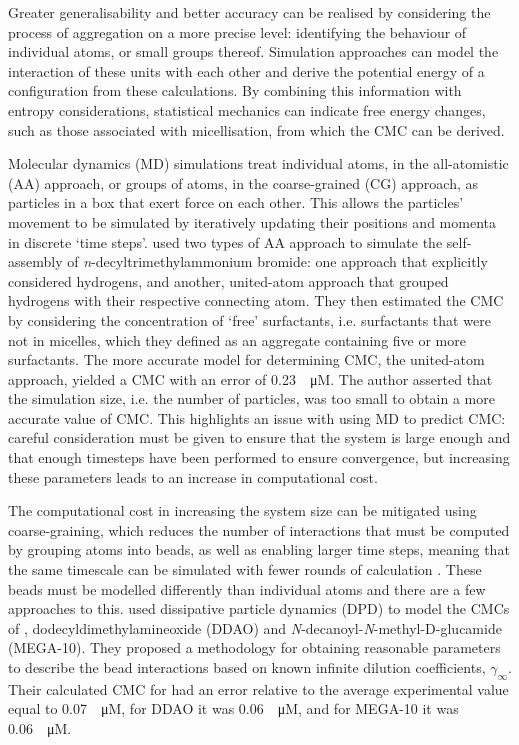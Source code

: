 Greater generalisability and better accuracy can be realised by considering the
process of aggregation on a more precise level: identifying the behaviour of
individual atoms, or small groups thereof. Simulation approaches can model the
interaction of these units with each other and derive the potential energy of a
configuration from these calculations. By combining this information with
entropy considerations, statistical mechanics can indicate free energy changes,
such as those associated with micellisation, from which the CMC can be derived.

Molecular dynamics (MD) simulations treat individual atoms, in the all-atomistic
(AA) approach, or groups of atoms, in the coarse-grained (CG) approach, as
particles in a box that exert force on each other. This allows the particles'
movement to be simulated by iteratively updating their positions and momenta in
discrete `time steps'. \citet{jorgeMolecularDynamicsSimulation2008} used two
types of AA approach to simulate the self-assembly of
\textit{n}-decyltrimethylammonium bromide: one approach that explicitly
considered hydrogens, and another, united-atom approach that grouped hydrogens
with their respective connecting atom. They then estimated the CMC by
considering the concentration of `free' surfactants, i.e. surfactants that were
not in micelles, which they defined as an aggregate containing five or more
surfactants. The more accurate model for determining CMC, the united-atom
approach, yielded a CMC with an error of \SI{0.23}{\log \micro M}. The author
asserted that the simulation size, i.e. the number of particles, was too small
to obtain a more accurate value of CMC. This highlights an issue with using MD
to predict CMC: careful consideration must be given to ensure that the system is
large enough and that enough timesteps have been performed to ensure
convergence, but increasing these parameters leads to an increase in
computational cost.

The computational cost in increasing the system size can be mitigated using
coarse-graining, which reduces the number of interactions that must be computed
by grouping atoms into beads, as well as enabling larger time steps, meaning
that the same timescale can be simulated with fewer rounds of calculation
\cite{fitzgeraldMultiscaleModelingNanomaterials2015}. These beads must be
modelled differently than individual atoms and there are a few approaches to
this. \citet{vishnyakovPredictionCriticalMicelle2013} used dissipative particle
dynamics (DPD) to model the CMCs of , dodecyldimethylamineoxide (DDAO)
and \textit{N}-decanoyl-\textit{N}-methyl-\textsc{D}-glucamide (MEGA-10). They
proposed a methodology for obtaining reasonable parameters to describe the bead
interactions based on known infinite dilution coefficients, $\gamma_\infty$.
Their calculated CMC for  had an error relative to the average
experimental value equal to \SI{0.07}{\log \micro M}, for DDAO it was
\SI{0.06}{\log \micro M}, and for MEGA-10 it was \SI{0.06}{\log \micro M}.

